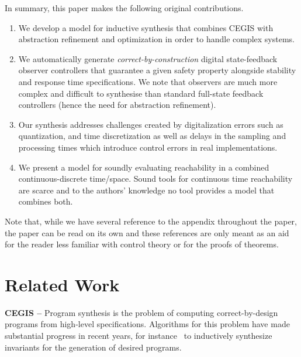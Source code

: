 \documentclass[sigconf]{llncs}
\begin{document}
In summary, this paper makes the following original contributions.
%
\begin{enumerate}
\item We develop a model for inductive synthesis that combines CEGIS with
  abstraction refinement and optimization in order to handle complex
  systems. 
%
\item We automatically generate \emph{correct-by-construction} digital
  state-feedback observer controllers that guarantee a given safety property
  alongside stability and response time specifications.  We note that
  observers are much more complex and difficult to synthesise than standard
  full-state feedback controllers (hence the need for abstraction refinement).
%
\item  Our synthesis addresses challenges created by digitalization errors
 such as quantization, and time discretization as well as delays in the
 sampling and processing times which introduce control errors in real
 implementations.
 \item We present a model for soundly evaluating reachability in a combined 
 continuous-discrete time/space. Sound tools for continuous time reachability 
 are scarce and to the authors' knowledge no tool provides a model that 
 combines both. 
\end{enumerate}

Note that, while we have several reference to the appendix throughout
the paper, the paper can be read on its own and these references are
only meant as an aid for the reader less familiar with control theory or
for the proofs of theorems.

\section{Related Work}
\label{sec:relw}

\textbf{CEGIS --}
Program synthesis is the problem of computing correct-by-design programs
from high-level specifications.  Algorithms for this problem have made
substantial progress in recent years, for instance~\cite{itzhaky2010simple}
to inductively synthesize invariants for the generation of desired programs.
\end{document}
